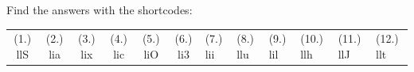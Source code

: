    
  \label{m37830**end}
    
\par {} Find the answers with the shortcodes:
 \par \begin{tabular}[h]{cccccc}
 (1.) llS  &  (2.) lia  &  (3.) lix  &  (4.) lic  &  (5.) liO  &  (6.) li3  &  (7.) lii  &  (8.) llu  &  (9.) lil  &  (10.) llh  &  (11.) llJ  &  (12.) llt  & \end{tabular}




